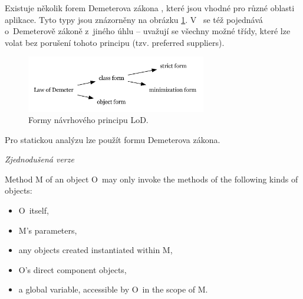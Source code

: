 
Existuje několik forem Demeterova zákona \cite{35588}, které jsou vhodné pro různé oblasti aplikace. Tyto typy jsou znázorněny na obrázku \ref{demeter_law_types}. V~\cite{35588} se též pojednává o~Demeterově zákoně z~jiného úhlu -- uvažují se všechny možné třídy, které lze volat bez porušení tohoto principu (tzv. preferred suppliers).

\begin{figure}[h!]
  \centering
  \includegraphics[width=0.7\textwidth]{./graphs/demeter_law_types.png}
  \caption{Formy návrhového principu LoD.\label{demeter_law_types}}
\end{figure}

Pro statickou analýzu lze použít  formu Demeterova zákona.


\emph{Zjednodušená verze \cite{wiki:lod}}

Method M of an object O~may only invoke the methods of the following kinds of objects:

\begin{itemize}
\item O~itself,
\item M's parameters,
\item any objects created instantiated within M,
\item O's direct component objects,
\item a global variable, accessible by O~in the scope of M.
\end{itemize}

